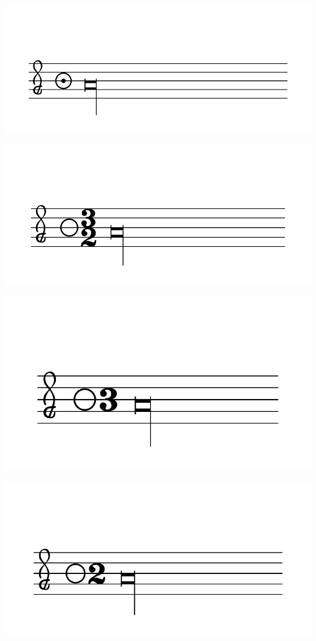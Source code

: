 \documentclass{article}
\begin{document}
        \includegraphics[scale=0.5]{figures_tests/pdf/smens/perfectmeter7.pdf}

        \includegraphics[scale=0.5]{figures_tests/pdf/smens/perfectmeter8.pdf}

        \includegraphics[scale=0.5]{figures_tests/pdf/smens/perfectmeter9.pdf}

        \includegraphics[scale=0.5]{figures_tests/pdf/smens/perfectmeter10.pdf}
\end{document}
